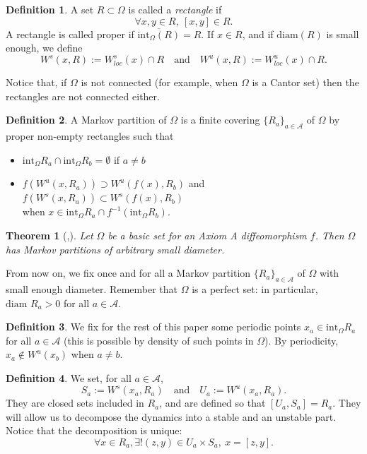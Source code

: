 \documentclass[a4paper]{article}
\newtheorem{theorem}{Theorem}[section]
\theoremstyle{definition}
\newtheorem{definition}{Definition}[section]
\begin{document}
\begin{definition}
A set $R \subset \Omega$ is called a \emph{rectangle} if 
$$ \forall x,y \in R, \ [x,y] \in R .$$
A rectangle is called proper if $\overline{\text{int}_\Omega(R)} = R$. If $x \in R$, and if $\text{diam}(R)$ is small enough, we define $$ W^s(x,R) := W^s_{loc}(x) \cap R  \quad \text{and} \quad W^u(x,R) := W^u_{loc}(x) \cap R .$$

\end{definition}

Notice that, if $\Omega$ is not connected (for example, when $\Omega$ is a Cantor set) then the rectangles are not connected either. 

\begin{definition}
A Markov partition of $\Omega$ is a finite covering $\{R_a\}_{a \in \mathcal{A}}$ of $\Omega$ by proper non-empty rectangles such that
\begin{itemize}
    \item $\text{int}_\Omega R_a \cap \text{int}_\Omega R_b = \emptyset$ if $a \neq b$
    \item $f\left( W^u(x,R_a) \right) \supset W^u(f(x),R_b)$ and $f\left( W^s(x,R_a) \right) \subset W^s(f(x),R_b)$ \\ when $x \in \text{int}_\Omega R_a \cap f^{-1}\left(\text{int}_\Omega R_b \right)$. 
\end{itemize}
\end{definition}

\begin{theorem}[\cite{Bo75},\cite{KH95}]
Let $\Omega$ be a basic set for an Axiom A diffeomorphism $f$. Then $\Omega$ has Markov partitions of arbitrary small diameter.
\end{theorem}

From now on, we fix once and for all a Markov partition $\{R_a\}_{a \in \mathcal{A}}$ of $\Omega$ with small enough diameter. Remember that $\Omega$ is a perfect set: in particular, $\text{diam } R_a >0$ for all $a \in \mathcal{A}$. 

\begin{definition}
We fix for the rest of this paper some periodic points $x_a \in \text{int}_\Omega R_a$ for all $a \in \mathcal{A}$ (this is possible by density of such points in $\Omega$). By periodicity, $x_a \notin W^u(x_b)$ when $a \neq b$. 
\end{definition}


\begin{definition}

We set, for all $a \in \mathcal{A}$, $$ S_a := W^s(x_a,R_a) \quad \text{and} \quad U_a := W^u(x_a,R_a) .$$
They are closed sets included in $R_a$, and are defined so that $[U_a,S_a] = R_a$. They will allow us to decompose the dynamics into a stable and an unstable part. Notice that the decomposition is unique:
$$ \forall x \in R_a, \exists ! (z,y) \in U_a \times S_a, \ x=[z,y] .$$

\end{definition}
\end{document}
